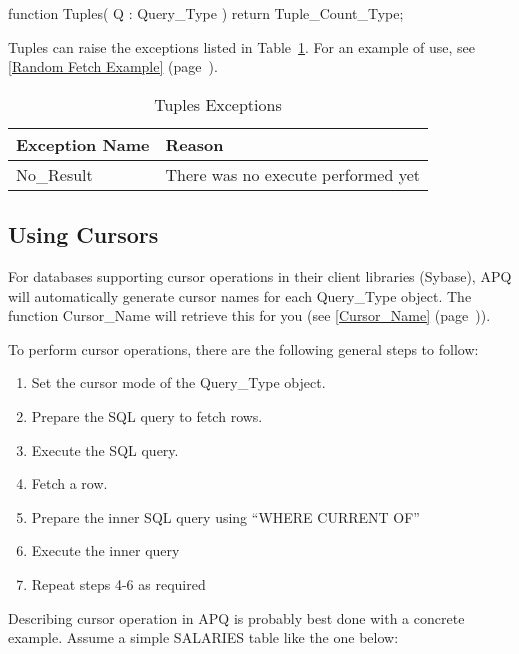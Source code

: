 \documentclass[english,letterpaper]{book}
\newcommand\Ref[1]{\textsection\ref{#1} (page~\pageref{#1})}
\begin{document}
\begin{Code}
function Tuples(
   Q : Query_Type
) return Tuple_Count_Type;
\end{Code}

Tuples can raise the exceptions listed in Table~\ref{t:tupsx}. For an
example of use, see \Ref{Random Fetch Example}.

\begin{table}
   \begin{center}
      \begin{tabular}{ll}
         Exception Name    &  Reason\\
         \hline 
         No\_Result        &  There was no execute performed yet\\
      \end{tabular}
   \end{center}
   \caption{Tuples Exceptions}\label{t:tupsx}
\end{table}

\subsection{Using Cursors}

For databases supporting cursor operations in their client libraries
(Sybase), APQ will automatically generate cursor names for each Query\_Type
object. The function Cursor\_Name will retrieve this for you (see
\Ref{Cursor_Name}).

To perform cursor operations, there are the following general steps
to follow:

\begin{enumerate}
   \item Set the cursor mode of the Query\_Type object.
   \item Prepare the SQL query to fetch rows.
   \item Execute the SQL query.
   \item Fetch a row.
   \item Prepare the inner SQL query using ``WHERE CURRENT OF''
   \item Execute the inner query
   \item Repeat steps 4-6 as required
\end{enumerate}

Describing cursor operation in APQ is probably best done with a concrete
example. Assume a simple SALARIES table like the one below:
\end{document}
